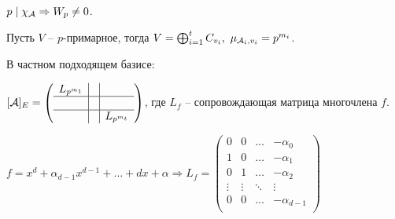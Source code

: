 \documentclass[main]{subfiles}
\begin{document}
\begin{remark}
    $p \mid \chi_{\mathcal{A}} \Rightarrow W_p \neq 0$.
\end{remark}

\begin{remark}
    Пусть $V$ -- $p$-примарное, тогда $V = \bigoplus_{i = 1}^{t} C_{v_i}, \ \mu_{\mca_i, v_i} = p^{m_i}$.
\end{remark}

В частном подходящем базисе:

$[\mathcal{A}]_E = \left(\begin{array}{c|c|c}
            L_{p^{m_1}} &  &             \\
            \hline
                        &  &             \\
            \hline
                        &  & L_{p^{m_t}} \\
        \end{array}\right)$, где $L_f$ -- сопровождающая матрица многочлена $f$.

$f = x^d + \alpha_{d - 1} x^{d - 1} + \ldots + dx + \alpha \Rightarrow L_f = \begin{pmatrix}
        0      & 0      & \ldots & -\alpha_0     \\
        1      & 0      & \ldots & -\alpha_1     \\
        0      & 1      & \ldots & -\alpha_2     \\
        \vdots & \vdots & \ddots & \vdots        \\
        0      & 0      & \ldots & -\alpha_{d-1} \\
    \end{pmatrix}$
\end{document}
